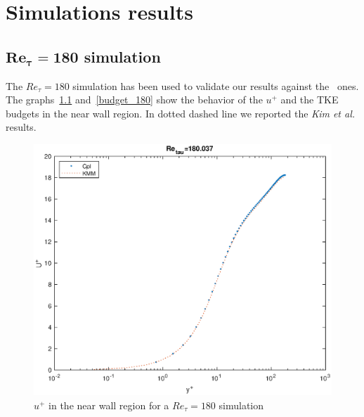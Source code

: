 \chapter{Simulations results}
\section{$\mathbf{Re_{\tau}=180}$ simulation}

The $Re_{\tau}=180$ simulation has been used to validate our results against the~\cite{kim_moin_moser} ones.
The graphs~\ref{loglaw_180} and~\ref{budget_180} show the behavior of the $u^{+}$ and the TKE budgets in the near wall region. In dotted dashed line we reported the \emph{Kim et al.} results. \par

\begin{figure}
\begin{center}
\includegraphics[scale=0.55]{grafici/loglaw_180.eps}
\caption{$u^{+}$ in the near wall region for a $Re_{\tau}=180$ simulation}
\label{loglaw_180}
\end{center} 
\end{figure}

